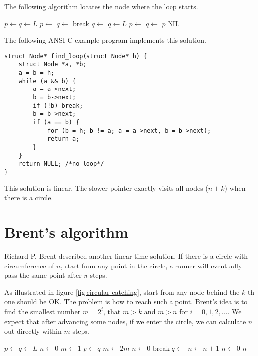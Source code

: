 \documentclass{article}
\begin{document}
The following algorithm locates the node where the loop starts.

\begin{algorithmic}[1]
  \State $p \gets q \gets L$
    \State $p \gets$ 
    \State $q \gets$ 
      \State break
    \EndIf
    \State $q \gets$ 
      \State $q \gets L$
        \State $p \gets$ 
        \State $q \gets$ 
      \EndWhile
      \State \Return $p$ 
    \EndIf
  \EndWhile
  \State \Return NIL 
\EndFunction
\end{algorithmic}

The following ANSI C example program implements this solution.

\lstset{language=C}
\begin{lstlisting}
struct Node* find_loop(struct Node* h) {
    struct Node *a, *b;
    a = b = h;
    while (a && b) {
        a = a->next;
        b = b->next;
        if (!b) break;
        b = b->next;
        if (a == b) {
            for (b = h; b != a; a = a->next, b = b->next);
            return a;
        }
    }
    return NULL; /*no loop*/
}
\end{lstlisting}

This solution is linear. The slower pointer exactly visits all nodes ($n + k$) when there is a circle.

\section{Brent's algorithm}
Richard P. Brent described another linear time solution. If there is a circle with
circumference of $n$, start from any point in the circle, a runner will eventually
pass the same point after $n$ steps.

As illustrated in figure \ref{fig:circular-catching}, start from any node behind the
$k$-th one should be OK. The problem is how to reach such a point. Brent's idea
is to find the smallest number $m = 2^i$, that $m > k$ and $m > n$ for $i = 0, 1, 2, ...$.
We expect that after advancing some nodes, if we enter the circle, we can calculate
$n$ out directly within $m$ steps.

\begin{algorithmic}[1]
  \State $p \gets q \gets L$
  \State $n \gets 0$
  \State $m \gets 1$
  \Repeat
      \State $p \gets q$
      \State $m \gets 2m$
      \State $n \gets 0$
    \EndIf
      \State break
    \EndIf
    \State $q \gets$ 
    \State $n \gets n + 1$
     \State $n \gets 0$
  \EndIf
  \State \Return $n$
\EndFunction
\end{algorithmic}
\end{document}
